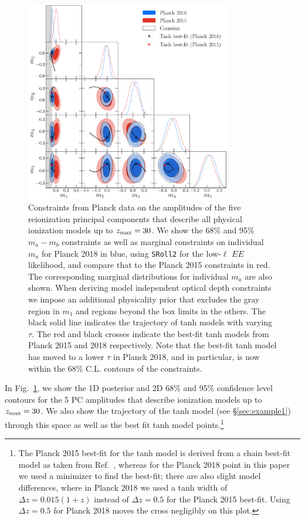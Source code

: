 \documentclass[prd,twocolumn,amsmath,amssymb,floatfix,superscriptaddress,nofootinbib]{revtex4-1}
\newcommand{\zmax}{z_{\rm max}}
\begin{document}
\begin{figure}
\includegraphics[width=0.8\textwidth]{paper/plots/plot_mj_triangle_t18_r12_t19_t20_vs_pl18_pc_zmax30_pliklite_srollv2_1015_wTauTrajectory_pl15_wTanhML_wGaussEllipse.pdf}
\caption{Constraints from Planck data on the amplitudes of the five reionization principal components that describe all physical ionization models up to $z_{\rm max} = 30$. We show  the 68\% and 95\% $m_a-m_b$ constraints as well as marginal constraints on individual $m_a$ for Planck 2018 in blue,
using \texttt{SRoll2} for the low-$\ell$ $EE$ likelihood, and compare that to the Planck 2015 constraints in red.  The corresponding marginal distributions for individual $m_a$ are also shown.
When deriving model independent optical depth constraints we impose an additional physicality prior that excludes the gray region in $m_1$ and regions beyond the box limits in the others.
 The black solid line indicates the trajectory of tanh models with varying $\tau$. The red and black crosses indicate the best-fit tanh models from Planck 2015 and 2018 respectively. Note that the best-fit tanh model has moved to a lower $\tau$ in Planck 2018, and in particular, is now within the 68\% C.L. contours of the constraints.
}
\label{fig:plot_mjs_2018_vs_2015}
\end{figure}
%
%
%
%
In Fig.~\ref{fig:plot_mjs_2018_vs_2015}, we show the 1D posterior and 2D 68\% and 95\% confidence level contours for the 5 PC amplitudes that describe ionization models up to $\zmax=30$. We also show the trajectory of the tanh model (see \S \ref{sec:example1}) through this space as well as the best fit tanh model points.\footnote{The Planck 2015 best-fit for the tanh model is derived from a chain best-fit model as taken from Ref.~\cite{Heinrich:2016ojb}, whereas for the Planck 2018 point in this paper we used a minimizer to find the best-fit; there are also slight model differences, where in Planck 2018 we used a tanh width of $\Delta z = 0.015(1+z)$ instead of $\Delta z = 0.5$ for the Planck 2015 best-fit. Using $\Delta z = 0.5$ for Planck 2018 moves the cross negligibly on this plot.}
\end{document}
